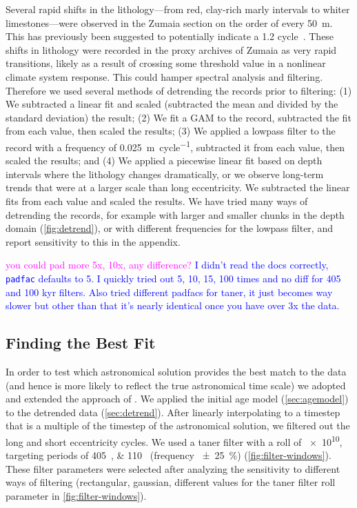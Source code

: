 \documentclass[draft]{agujournal2019}
\newcommand{\rez}{\textcolor{magenta}}
\newcommand{\ijk}{\textcolor{blue}}
\begin{document}
Several rapid shifts in the lithology---from red, clay-rich marly intervals to whiter limestones---were observed in the Zumaia section on the order of every \qty{50}{\metre}.
This has previously been suggested to potentially indicate a \qty{1.2}{\millionyear} cycle~.
These shifts in lithology were recorded in the proxy archives of Zumaia as very rapid transitions, likely as a result of crossing some threshold value in a nonlinear climate system response.
This could hamper spectral analysis and filtering.
Therefore we used several methods of detrending the records prior to filtering:
(1) We subtracted a linear fit and scaled (subtracted the mean and divided by the standard deviation) the result;
(2) We fit a \gls{GAM} to the record, subtracted the fit from each value, then scaled the results;
(3) We applied a lowpass filter to the record with a frequency of \qty{0.025}{\metre\per cycle}, subtracted it from each value, then scaled the results;
and (4) We applied a piecewise linear fit based on depth intervals where the lithology changes dramatically, or we observe long-term trends that were at a larger scale than long eccentricity.
We subtracted the linear fits from each value and scaled the results.
We have tried many ways of detrending the records, for example with larger and smaller chunks in the depth domain (\cref{fig:detrend}), or with different frequencies for the lowpass filter, and report sensitivity to this in the appendix.

\rez{you could pad more 5x, 10x, any difference?}
\ijk{I didn't read the docs correctly, \texttt{padfac} defaults to 5.
    I quickly tried out 5, 10, 15, 100 times and no diff for 405 and 100 kyr filters.
    Also tried different padfacs for taner, it just becomes way slower but other than that it's nearly identical once you have over 3x the data.}

\subsection{Finding the Best Fit}\label{sec:algorithm}

In order to test which astronomical solution provides the best match to the data
(and hence is more likely to reflect the true astronomical time scale)
we adopted and extended the approach of .
We applied the initial age model (\cref{sec:agemodel}) to the detrended data (\cref{sec:detrend}).
After linearly interpolating to a timestep that is a multiple of the timestep of the astronomical solution,
we filtered out the long and short eccentricity cycles.
We used a taner filter with a roll of \num{e10}, targeting periods of \qtylist{405;110}{\kiloyear} (frequency \qty{\pm25}{\percent}) (\cref{fig:filter-windows}).
These filter parameters were selected after analyzing the sensitivity to different ways of filtering (rectangular, gaussian, different values for the taner filter roll parameter in \cref{fig:filter-windows}).
\end{document}
